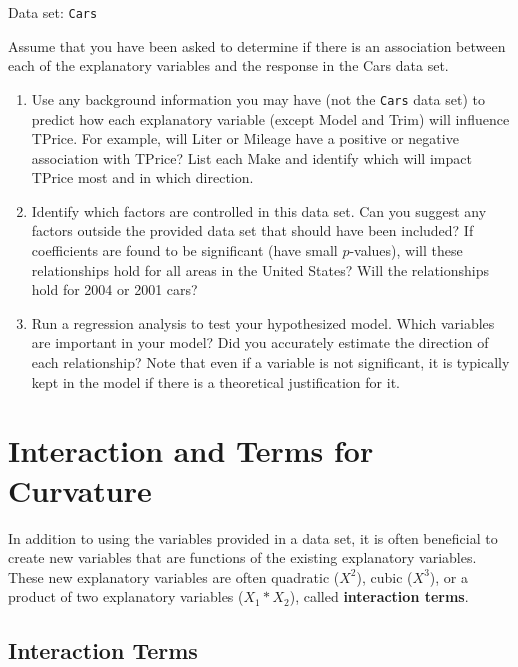 \documentclass[
]{book}
\begin{document}
Data set: \texttt{Cars}

Assume that you have been asked to determine if there is an association between each of the explanatory variables and the response in the Cars data set.

\begin{enumerate}
\def\labelenumi{\arabic{enumi}.}
\setcounter{enumi}{31}
\item
  Use any background information you may have (not the \texttt{Cars} data set) to predict how each explanatory variable (except Model and Trim) will influence TPrice. For example, will Liter or Mileage have a positive or negative association with TPrice? List each Make and identify which will impact TPrice most and in which direction.
\item
  Identify which factors are controlled in this data set. Can you suggest any factors outside the provided data set that should have been included? If coefficients are found to be significant (have small \(p\)-values), will these relationships hold for all areas in the United States? Will the relationships hold for 2004 or 2001 cars?
\item
  Run a regression analysis to test your hypothesized model. Which variables are important in your model? Did you accurately estimate the direction of each relationship? Note that even if a variable is not significant, it is typically kept in the model if there is a theoretical justification
  for it.
\end{enumerate}

\hypertarget{interaction-and-terms-for-curvature}{%
\section{Interaction and Terms for Curvature}\label{interaction-and-terms-for-curvature}}

In addition to using the variables provided in a data set, it is often beneficial to create new variables that are functions of the existing explanatory variables. These new explanatory variables are often quadratic (\(X^2\)), cubic (\(X^3\)), or a product of two explanatory variables (\(X_1*X_2\)), called \textbf{interaction terms}.

\hypertarget{interaction-terms}{%
\subsection*{Interaction Terms}\label{interaction-terms}}
\end{document}

